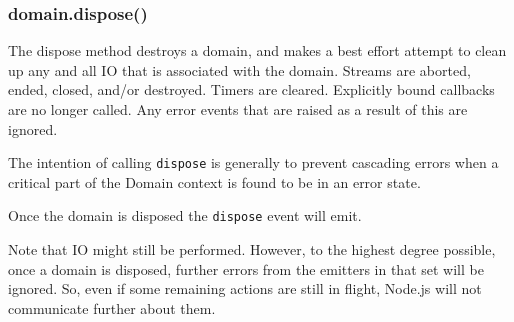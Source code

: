 \begin{Shaded}
\begin{Highlighting}[]
 \NormalTok{();}

 
  \NormalTok{, }\NormalTok{(}

     
  \NormalTok{\}));}
\NormalTok{\}}

\NormalTok{(}\NormalTok{, }
\NormalTok{\});}
\end{Highlighting}
\end{Shaded}

\subsubsection{domain.dispose()}

The dispose method destroys a domain, and makes a best effort attempt to
clean up any and all IO that is associated with the domain. Streams are
aborted, ended, closed, and/or destroyed. Timers are cleared. Explicitly
bound callbacks are no longer called. Any error events that are raised
as a result of this are ignored.

The intention of calling \texttt{dispose} is generally to prevent
cascading errors when a critical part of the Domain context is found to
be in an error state.

Once the domain is disposed the \texttt{dispose} event will emit.

Note that IO might still be performed. However, to the highest degree
possible, once a domain is disposed, further errors from the emitters in
that set will be ignored. So, even if some remaining actions are still
in flight, Node.js will not communicate further about them.
